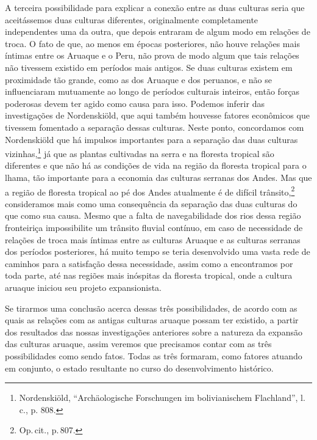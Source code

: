 A terceira possibilidade para explicar a conexão entre as duas culturas
seria que aceitássemos duas culturas diferentes, originalmente
completamente independentes uma da outra, que depois entraram de algum
modo em relações de troca. O fato de que, ao menos em épocas
posteriores, não houve relações mais íntimas entre os Aruaque e o Peru,
não prova de modo algum que tais relações não tivessem existido em
períodos mais antigos. Se duas culturas existem em proximidade tão
grande, como as dos Aruaque e dos peruanos, e não se influenciaram
mutuamente ao longo de períodos culturais inteiros, então forças
poderosas devem ter agido como causa para isso. Podemos inferir das
investigações de Nordenskiöld, que aqui também houvesse fatores
econômicos que tivessem fomentado a separação dessas culturas. Neste
ponto, concordamos com Nordenskiöld que há impulsos importantes para a
separação das duas culturas vizinhas,\footnote{Nordenskiöld,
  ``Archäologische Forschungen im bolivianischem Flachland'', l. c., p.
  808.} já que as plantas cultivadas na serra e na floresta tropical
são diferentes e que não há as condições de vida na região da floresta
tropical para o lhama, tão importante para a economia das culturas
serranas dos Andes. Mas que a região de floresta tropical ao pé dos
Andes atualmente é de difícil trânsito,\footnote{Op.\,cit., p.\,807.}
consideramos mais como uma consequência da separação das duas culturas
do que como sua causa. Mesmo que a falta de navegabilidade dos rios
dessa região fronteiriça impossibilite um trânsito fluvial contínuo, em
caso de necessidade de relações de troca mais íntimas entre as culturas
Aruaque e as culturas serranas dos períodos posteriores, há muito tempo
se teria desenvolvido uma vasta rede de caminhos para a satisfação dessa
necessidade, assim como a encontramos por toda parte, até nas regiões
mais inóspitas da floresta tropical, onde a cultura aruaque iniciou seu
projeto expansionista.

Se tirarmos uma conclusão acerca dessas três possibilidades, de acordo
com as quais as relações com as antigas culturas aruaque possam ter
existido, a partir dos resultados das nossas investigações anteriores
sobre a natureza da expansão das culturas aruaque, assim veremos que
precisamos contar com as três possibilidades como sendo fatos. Todas as
três formaram, como fatores atuando em conjunto, o estado resultante no
curso do desenvolvimento histórico.

